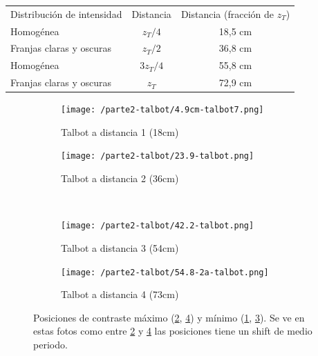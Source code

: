 \documentclass{./packages/optica-article}
\begin{document}
\begin{center}
	\begin{tabular}{|l|c|c|} \hline
		Distribución de intensidad & Distancia & Distancia (fracción de $z_T$) \\
		Homogénea                  & $z_T/4$   & 18,5 cm                       \\
		Franjas claras y oscuras   & $z_T/2$   & 36,8 cm                       \\
		Homogénea                  & $3z_T/4$  & 55,8 cm                       \\
		Franjas claras y oscuras   & $z_T$     & 72,9 cm                       \\\hline
	\end{tabular}
	\label{tab:talbot}
\end{center}

\begin{figure}[hptb]
	\begin{center}
		\begin{subfigure}[t]{0.45\textwidth}\centering
			\texttt{[image: /parte2-talbot/4.9cm-talbot7.png]}
			\caption{ Talbot a distancia 1 (18cm)}
			\label{fig:talbot1}
		\end{subfigure}
		\quad
		\begin{subfigure}[t]{0.45\textwidth}\centering
			\texttt{[image: /parte2-talbot/23.9-talbot.png]}
			\caption{Talbot a distancia 2 (36cm)}
			\label{fig:talbot2}
		\end{subfigure}
		\\
		\begin{subfigure}[t]{0.45\textwidth}\centering
			\texttt{[image: /parte2-talbot/42.2-talbot.png]}
			\caption{ Talbot a distancia 3 (54cm)}
			\label{fig:talbot3}
		\end{subfigure}
		\quad
		\begin{subfigure}[t]{0.45\textwidth}\centering
			\texttt{[image: /parte2-talbot/54.8-2a-talbot.png]}
			\caption{ Talbot a distancia 4 (73cm)}
			\label{fig:talbot4}
		\end{subfigure}

		\caption{Posiciones de contraste máximo (\ref{fig:talbot2}, \ref{fig:talbot4}) y mínimo (\ref{fig:talbot1}, \ref{fig:talbot3}).
			Se ve en estas fotos como entre \ref{fig:talbot2} y \ref{fig:talbot4} las posiciones tiene un shift de medio periodo.}
		\label{fig:alltalbot}
	\end{center}
\end{figure}
\end{document}
